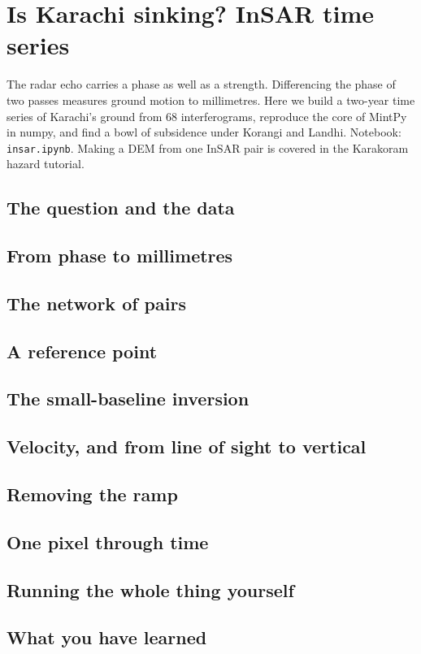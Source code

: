\chapter{Is Karachi sinking? InSAR time series}\label{ch:insar}
The radar echo carries a phase as well as a strength. Differencing the phase of two passes measures ground motion to millimetres. Here we build a two-year time series of Karachi's ground from 68 interferograms, reproduce the core of MintPy in numpy, and find a bowl of subsidence under Korangi and Landhi. Notebook: \texttt{insar.ipynb}. Making a DEM from one InSAR pair is covered in the Karakoram hazard tutorial.

\section{The question and the data}

\section{From phase to millimetres}

\section{The network of pairs}

\section{A reference point}

\section{The small-baseline inversion}

\section{Velocity, and from line of sight to vertical}

\section{Removing the ramp}

\section{One pixel through time}

\section{Running the whole thing yourself}

\section{What you have learned}

